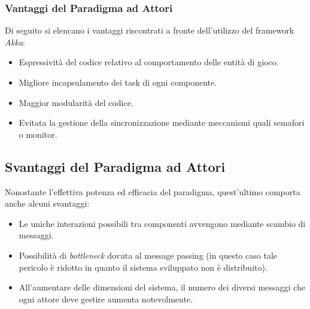 \subsubsection{Vantaggi del Paradigma ad Attori}
Di seguito si elencano i vantaggi riscontrati a fronte dell'utilizzo del framework \textit{Akka}:
\begin{itemize}
    \item Espressività del codice relativo al comportamento delle entità di gioco.
    \item Migliore incapsulamento dei task di ogni componente.
    \item Maggior modularità del codice.
    \item Evitata la gestione della sincronizzazione mediante meccanismi quali semafori o monitor.
\end{itemize}

\subsection{Svantaggi del Paradigma ad Attori}
Nonostante l'effettiva potenza ed efficacia del paradigma, quest'ultimo comporta anche alcuni svantaggi:
\begin{itemize}
    \item Le uniche interazioni possibili tra componenti avvengono mediante scambio di messaggi.
    \item Possibilità di \textit{bottleneck} dovuta al message passing (in questo caso tale pericolo è ridotto in quanto il sistema sviluppato non è distribuito).
    \item All'aumentare delle dimensioni del sistema, il numero dei diversi messaggi che ogni attore deve gestire aumenta notevolmente.
\end{itemize}

